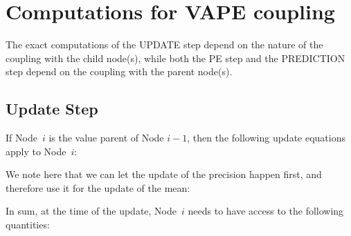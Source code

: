 \section{Computations for VAPE coupling}
The exact computations of the \textsf{UPDATE step} depend on the nature of the coupling with the child node(s), while both the \textsf{PE step} and the \textsf{PREDICTION step} depend on the coupling with the parent node(s).

\subsection{Update Step}
If Node~$i$ is the value parent of Node $i-1$, then the following update equations apply to Node~$i$:
\vspace{0.5cm}

\noindent
{}%
\vspace{0.5cm}

\noindent
We note here that we can let the update of the precision happen first, and therefore use it for the update of the mean:
\vspace{0.5cm}

\noindent
{}%
\vspace{0.5cm}

\noindent
In sum, at the time of the update, Node~$i$ needs to have access to the following quantities:

